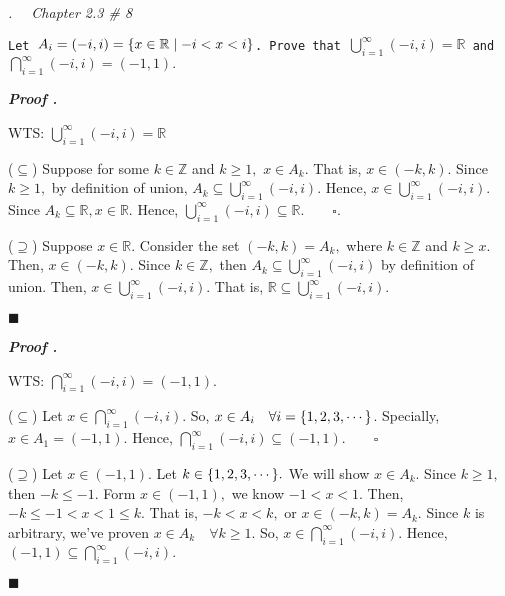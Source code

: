 \documentclass[11pt,letter]{article}
\newcounter{nq}[section]
\newcounter{np}[section]
\newenvironment*{p}{\par\noindent\textbf{\textit{Proof \stepcounter{np}\thenp. }}\par}{\par\hfill $\blacksquare$\par}
\newenvironment*{q}[1]{\noindent\emph{\thesection.\stepcounter{nq}\thenq$\quad $ #1}\par\noindent\texttt}{}
\def\Z{{\mathbb{Z}}}
\def\R{{\mathbb{R}}}
\def\dsst{\displaystyle}
\begin{document}
\begin{framed}\begin{q}
	{Chapter 2.3 \# 8}
	{Let $A_i=(-i,i)=\qty{x\in\R\mid-i<x<i}$. Prove that $\dsst\bigcup_{i=1}^\infty(-i,i)=\R$ and $\dsst\bigcap_{i=1}^\infty(-i,i)=(-1,1).$}
\end{q}\end{framed}
\begin{p}
	WTS: $\dsst\bigcup_{i=1}^\infty(-i,i)=\R$\par 
	($\subseteq$) Suppose for some $k\in\Z$ and $k\geq1,$ $x\in A_k.$ That is, $x\in(-k,k).$ Since $k\geq1,$ by definition of union, $A_k\subseteq\dsst\bigcup_{i=1}^\infty(-i,i).$ Hence, $x\in\dsst\bigcup_{i=1}^\infty(-i,i).$ Since $A_k\subseteq\R, x\in\R.$ Hence, $\dsst\bigcup_{i=1}^\infty(-i,i)\subseteq\R.\qquad\square.$\par 
	($\supseteq$) Suppose $x\in\R.$ Consider the set $(-k,k)=A_k,$ where $k\in\Z$ and $k\geq x.$ Then, $x\in(-k,k).$ Since $k\in\Z,$ then $A_k\subseteq\dsst\bigcup_{i=1}^\infty(-i,i)$ by definition of union. Then, $x\in\dsst\bigcup_{i=1}^\infty(-i,i).$ That is, $\R\subseteq\dsst\bigcup_{i=1}^\infty(-i,i).$\par 
\end{p}
\begin{p}
	WTS: $\dsst\bigcap_{i=1}^\infty(-i,i)=(-1,1).$\par 
	($\subseteq$) Let $x\in\dsst\bigcap_{i=1}^\infty(-i,i).$ So, $x\in A_i\quad\forall i=\qty{1,2,3,\cdots}$. Specially, $x\in A_1=(-1,1).$ Hence, $\dsst\bigcap_{i=1}^\infty(-i,i)\subseteq(-1,1).\qquad\square$\par 
	($\supseteq$) Let $x\in(-1,1).$ Let $k\in\qty{1,2,3,\cdots}.$ We will show $x\in A_k.$ Since $k\geq1,$ then $-k\leq-1.$ Form $x\in(-1,1),$ we know $-1<x<1.$ Then, $-k\leq-1<x<1\leq k.$ That is, $-k<x<k,$ or $x\in(-k,k)=A_k.$ Since $k$ is arbitrary, we've proven $x\in A_k\quad\forall k\geq1.$ So, $x\in\dsst\bigcap_{i=1}^\infty(-i,i).$ Hence, $(-1,1)\subseteq\dsst\bigcap_{i=1}^\infty(-i,i).$
\end{p}
\end{document}
